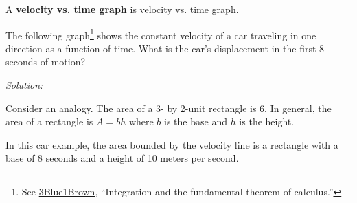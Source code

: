 \documentclass[dvipsnames]{article}
\begin{document}
A \textbf{\gls{velocity vs. time graph}} is \glsdesc{velocity vs. time graph}.

\begin{example}
The following graph\footnote{See \href{https://youtu.be/rfG8ce4nNh0?si=YnRiAhbPOc-2eW6s&t=162}{3Blue1Brown}, ``Integration and the fundamental theorem of calculus.''} shows the constant velocity of a car traveling in one direction as a function of time. What is the car's displacement in the first 8 seconds of motion?

\begin{center}
\end{center}
\end{example}

\textit{Solution:}

Consider an analogy. The area of a 3- by 2-unit rectangle is 6. In general, the area of a rectangle is $A = bh$ where $b$ is the base and $h$ is the height.

\begin{center}
\hspace{1cm}
\end{center}

In this car example, the area bounded by the velocity line is a rectangle with a base of 8 seconds and a height of 10 meters per second.
\end{document}
